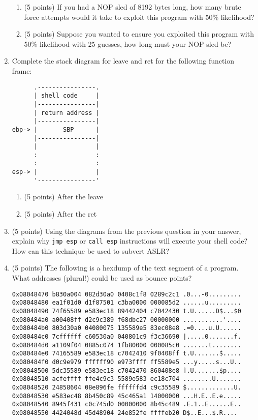 \documentclass{article}[9pt]
\begin{document}
\begin{enumerate}
\begin{enumerate}
\item (5 points) If you had a NOP sled of 8192 bytes long, how many brute force
attempts would it take to exploit this program with 50\%
likelihood?

\item (5 points) Suppose you wanted to ensure you exploited this program with
50\% likelihood with 25 guesses, how long must your NOP sled
be?
\end{enumerate}

\item Complete the stack diagram for leave and ret for the following
function frame:

\begin{verbatim}
      .----------------.
      | shell code     |
      |----------------|
      | return address |
      |----------------|
ebp-> |       SBP      |
      |----------------|
      |                |
      :                :
      :                :
esp-> |                |
      '----------------'
\end{verbatim}

\begin{enumerate}
\item (5 points) After the leave

\item (5 points) After the ret
\end{enumerate}

\item (5 points) Using the diagrams from the previous question in your answer,
explain why \texttt{jmp esp} or \texttt{call esp} instructions will execute
your shell code? How can this technique be used to subvert ASLR?

\item (5 points) The following is a hexdump of the text segment of a
program. What addresses (plural!) could be used as bounce
points?

\begin{verbatim}
0x08048470 b830a004 082d30a0 0408c1f8 0289c2c1 .0...-0.........
0x08048480 ea1f01d0 d1f87501 c3ba0000 000085d2 ......u.........
0x08048490 74f65589 e583ec18 89442404 c7042430 t.U......D$...$0
0x080484a0 a00408ff d2c9c389 f68dbc27 00000000 ...........'....
0x080484b0 803d30a0 04080075 135589e5 83ec08e8 .=0....u.U......
0x080484c0 7cffffff c60530a0 040801c9 f3c36690 |.....0.......f.
0x080484d0 a1109f04 0885c074 1fb80000 000085c0 .......t........
0x080484e0 74165589 e583ec18 c7042410 9f0408ff t.U.......$.....
0x080484f0 d0c9e979 ffffff90 e973ffff ff5589e5 ...y.....s...U..
0x08048500 5dc35589 e583ec18 c7042470 860408e8 ].U.......$p....
0x08048510 acfeffff ffe4c9c3 5589e583 ec18c704 ........U.......
0x08048520 24858604 08e896fe ffffffd4 c9c35589 $.............U.
0x08048530 e583ec48 8b450c89 45c465a1 14000000 ...H.E..E.e.....
0x08048540 8945f431 c0c745d0 00000000 8b45c489 .E.1..E......E..
0x08048550 4424048d 45d48904 24e852fe ffffeb20 D$..E...$.R....      
\end{verbatim}
\end{enumerate}
\end{document}
